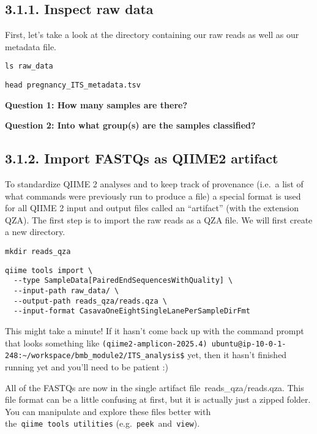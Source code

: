 \documentclass[
]{book}
\begin{document}
\subsection{3.1.1. Inspect raw data}\label{inspect-raw-data-2}

First, let's take a look at the directory containing our raw reads as well as our metadata file.

\begin{verbatim}
ls raw_data
\end{verbatim}

\begin{verbatim}
head pregnancy_ITS_metadata.tsv
\end{verbatim}

\textbf{Question 1: How many samples are there?}

\textbf{Question 2: Into what group(s) are the samples classified?}

\subsection{3.1.2. Import FASTQs as QIIME2 artifact}\label{import-fastqs-as-qiime2-artifact-2}

To standardize QIIME 2 analyses and to keep track of provenance (i.e.~a list of what commands were previously run to produce a file) a special format is used for all QIIME 2 input and output files called an ``artifact'' (with the extension QZA). The first step is to import the raw reads as a QZA file. We will first create a new directory.

\begin{verbatim}
mkdir reads_qza
\end{verbatim}

\begin{verbatim}
qiime tools import \
  --type SampleData[PairedEndSequencesWithQuality] \
  --input-path raw_data/ \
  --output-path reads_qza/reads.qza \
  --input-format CasavaOneEightSingleLanePerSampleDirFmt
\end{verbatim}

This might take a minute! If it hasn't come back up with the command prompt that looks something like \texttt{(qiime2-amplicon-2025.4)\ ubuntu@ip-10-0-1-248:\textasciitilde{}/workspace/bmb\_module2/ITS\_analysis\$} yet, then it hasn't finished running yet and you'll need to be patient :)

All of the FASTQs are now in the single artifact file~reads\_qza/reads.qza. This file format can be a little confusing at first, but it is actually just a zipped folder. You can manipulate and explore these files better with the~\texttt{qiime\ tools~utilities} (e.g.~\texttt{peek}~and~\texttt{view}).
\end{document}
